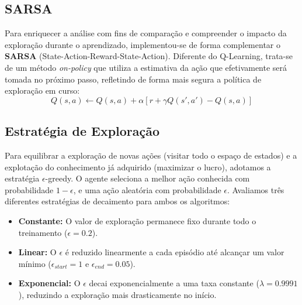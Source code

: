 \documentclass{article}
\begin{document}
\subsection{SARSA}
Para enriquecer a análise com fins de comparação e compreender o impacto da exploração durante o aprendizado, implementou-se de forma complementar o \textbf{SARSA} (State-Action-Reward-State-Action). Diferente do Q-Learning, trata-se de um método \textit{on-policy} que utiliza a estimativa da ação que efetivamente será tomada no próximo passo, refletindo de forma mais segura a política de exploração em curso:
\begin{equation}
    Q(s,a) \leftarrow Q(s,a) + \alpha \left[ r + \gamma Q(s',a') - Q(s,a) \right]
\end{equation}

\subsection{Estratégia de Exploração}
Para equilibrar a exploração de novas ações (visitar todo o espaço de estados) e a explotação do conhecimento já adquirido (maximizar o lucro), adotamos a estratégia $\epsilon$-greedy. O agente seleciona a melhor ação conhecida com probabilidade $1 - \epsilon$, e uma ação aleatória com probabilidade $\epsilon$. Avaliamos três diferentes estratégias de decaimento para ambos os algoritmos:
\begin{itemize}
    \item \textbf{Constante:} O valor de exploração permanece fixo durante todo o treinamento ($\epsilon = 0.2$).
    \item \textbf{Linear:} O $\epsilon$ é reduzido linearmente a cada episódio até alcançar um valor mínimo ($\epsilon_{start} = 1$ e $\epsilon_{end} = 0.05$).
    \item \textbf{Exponencial:} O $\epsilon$ decai exponencialmente a uma taxa constante ($\lambda = 0.9991$), reduzindo a exploração mais drasticamente no início.
\end{itemize}
\end{document}
